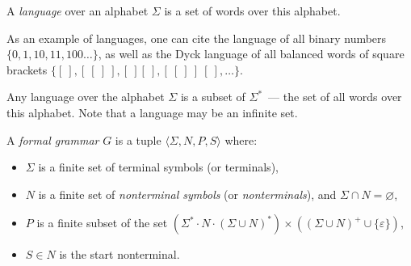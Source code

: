 \begin{definition}[A language]
	A \textit{language} over an alphabet $\Sigma$ is a set of words over this alphabet.
\end{definition}

As an example of languages, one can cite the language of all binary numbers $\{0, 1, 10, 11, 100 \dots\}$, as well as the Dyck language of all balanced words of square brackets $\{[~], [~[~]~], [~][~], [~[~]~]~[~], \dots\}$.

Any language over the alphabet $\Sigma$ is a subset of $\Sigma^*$~--- the set of all words over this alphabet. Note that a language may be an infinite set.

%		
\begin{definition}
	A \textit{formal grammar} $G$ is a tuple $\langle \Sigma, N, P, S \rangle$ where:  
	\begin{itemize}
		\item $\Sigma$ is a finite set of terminal symbols (or terminals), 
		\item $N$ is a finite set of \textit{nonterminal symbols} (or \textit{nonterminals}), and $\Sigma \cap N=\varnothing$, 
		\item $P$ is a finite subset of the set $( \Sigma^* \cdot N \cdot (\Sigma \cup N)^* ) \times ( (\Sigma \cup N)^+ \cup \{\varepsilon\} )$,  
		
		\item $S \in N$ is the start nonterminal. 
	\end{itemize}
\end{definition}

